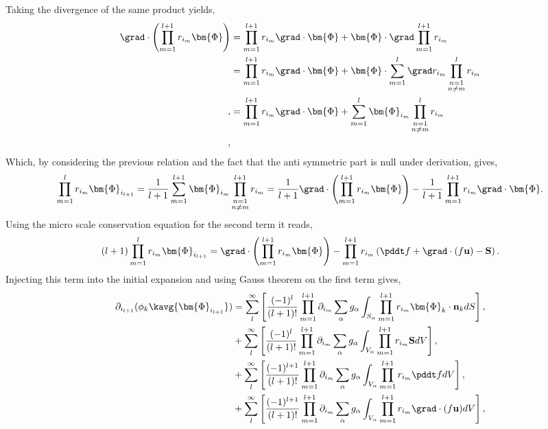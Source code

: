 Taking the divergence of the same product yields, 
\begin{align*}
    \grad \cdot \left(\prod^{l+1}_{m=1} r_{i_m} \bm{\Phi}\right)
    &= \prod^{l+1}_{m=1} r_{i_m} \grad \cdot \bm{\Phi}
    + \bm{\Phi} \cdot \grad \prod^{l+1}_{m=1} r_{i_m}\\
    &= \prod^{l+1}_{m=1} r_{i_m} \grad \cdot \bm{\Phi}
    + \bm{\Phi}  \cdot\sum_{m=1}^l \grad r_{i_m}  \prod^{l}_{\substack{n=1 \\ n \neq m}} r_{i_m}\\,
    &= \prod^{l+1}_{m=1} r_{i_m} \grad \cdot \bm{\Phi}
    + \sum_{m=1}^l \bm{\Phi}_{i_m}  \prod^{l}_{\substack{n=1 \\ n \neq m}} r_{i_m}\\,
\end{align*}
Which, by considering the previous relation and the fact that the anti symmetric part is null under derivation, gives, 
\begin{equation}
    \prod^{l}_{m=1} r_{i_m} \bm{\Phi}_{i_{l+1}}
    =\frac{1}{l+1}\sum_{m=1}^{l+1} \bm{\Phi}_{i_m}  \prod^{l+1}_{\substack{n=1 \\ n \neq m}} r_{i_m}
    =\frac{1}{l+1}\grad\cdot \left(\prod^{l+1}_{m=1} r_{i_m} \bm{\Phi}\right)
    - \frac{1}{l+1}\prod^{l+1}_{m=1} r_{i_m} \grad\cdot \bm{\Phi}.
\end{equation}
Using the micro scale conservation equation for the second term it reads, 
\begin{equation}
    (l+1) \prod^{l}_{m=1} r_{i_m} \bm{\Phi}_{i_{l+1}}
    =\grad \cdot \left(\prod^{l+1}_{m=1} r_{i_m} \bm{\Phi}\right)
    - \prod^{l+1}_{m=1} r_{i_m} \left(
        \pddt f 
        + \grad \cdot (f \textbf{u})
        - \textbf{S}
    \right).
\end{equation}
Injecting this term into the initial expansion and using Gauss theorem on the first term gives,
\begin{align*}
    \partial_{i_{l+1}}
    (\phi_k \kavg{\bm{\Phi}_{i_{l+1}}})
    & =\sum_l^\infty
    \left[
        \frac{(-1)^{l}}{(l+1)!}
        \prod^{l+1}_{m=1}
        \partial_{i_m}
        \sum_{\alpha}
        g_{\alpha}
        \int_{S_\alpha}
        \prod^{l+1}_{m=1}
        r_{i_m} \bm{\Phi}_k \cdot \textbf{n}_k dS
    \right],\\
    & +\sum_l^\infty
    \left[
        \frac{(-1)^{l}}{(l+1)!}
        \prod^{l+1}_{m=1}
        \partial_{i_m}
        \sum_{\alpha}
        g_{\alpha}
        \int_{V_\alpha}
        \prod^{l+1}_{m=1}
        r_{i_m} \textbf{S} dV
    \right],\\
    & +\sum_l^\infty
    \left[
        \frac{(-1)^{l+1}}{(l+1)!}
        \prod^{l+1}_{m=1}
        \partial_{i_m}
        \sum_{\alpha}
        g_{\alpha}
        \int_{V_\alpha}
        \prod^{l+1}_{m=1}
        r_{i_m} \pddt f dV
    \right],\\
    & +\sum_l^\infty
    \left[
        \frac{(-1)^{l+1}}{(l+1)!}
        \prod^{l+1}_{m=1}
        \partial_{i_m}
        \sum_{\alpha}
        g_{\alpha}
        \int_{V_\alpha}
        \prod^{l+1}_{m=1}
        r_{i_m} \grad \cdot (f \textbf{u}) dV
    \right],\\
\end{align*}
